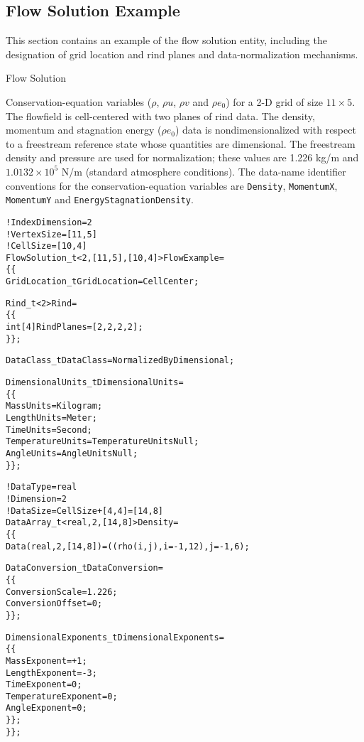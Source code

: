 \subsection{Flow Solution Example}
\label{s:flow_example}

This section contains an example of the flow solution entity, including
the designation of grid location and rind planes and data-normalization
mechanisms.

\begin{example}{Flow Solution}
\label{ex:flow}

Conservation-equation variables ($\rho$, $\rho u$, $\rho v$ and
$\rho e_0$) for a 2-D grid of size $11\times5$.
The flowfield is cell-centered with two planes of rind data.
The density, momentum and stagnation energy ($\rho e_0$) data is
nondimensionalized with respect to a freestream reference state whose
quantities are dimensional.
The freestream density and pressure are used for normalization; these
values are 1.226 kg/m and $1.0132 \!\times\! 10^{5}$ N/m
(standard atmosphere conditions).
The data-name identifier conventions for the conservation-equation
variables are \texttt{Density}, \texttt{MomentumX}, \texttt{MomentumY} and
\texttt{EnergyStagnationDensity}.
\begin{alltt}
  !  IndexDimension = 2
  !  VertexSize = [11,5]
  !  CellSize = [10,4]
  FlowSolution\_t<2, [11,5], [10,4]> FlowExample =
    \{\{
    GridLocation\_t GridLocation = CellCenter ;

    Rind\_t<2> Rind =
      \{\{
      int[4] RindPlanes = [2,2,2,2] ;
      \}\} ;

    DataClass\_t DataClass = NormalizedByDimensional ;
    
    DimensionalUnits\_t DimensionalUnits = 
      \{\{ 
      MassUnits        = Kilogram ;
      LengthUnits      = Meter ;
      TimeUnits        = Second ;
      TemperatureUnits = TemperatureUnitsNull ;
      AngleUnits       = AngleUnitsNull ;
      \}\} ;

    !  DataType = real
    !  Dimension = 2
    !  DataSize = CellSize + [4,4] = [14,8]
    DataArray\_t<real, 2, [14,8]> Density =
      \{\{
      Data(real, 2, [14,8]) = ((rho(i,j), i=-1,12), j=-1,6) ;

      DataConversion\_t DataConversion =
        \{\{
        ConversionScale  = 1.226 ;
        ConversionOffset = 0 ;
        \}\} ;

      DimensionalExponents\_t DimensionalExponents =
        \{\{
        MassExponent        = +1 ;
        LengthExponent      = -3 ;
        TimeExponent        =  0 ;
        TemperatureExponent =  0 ;
        AngleExponent       =  0 ;
        \}\} ;
      \}\} ;


\end{alltt}
\end{example}
